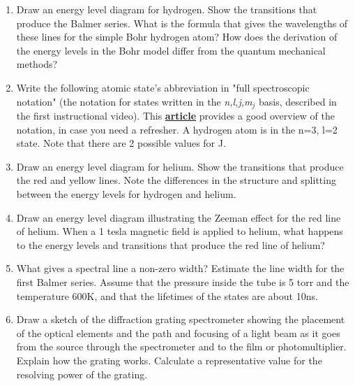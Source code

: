 \documentclass{signatures}
\begin{document}
\maketitle

\names

\prelab

\begin{enumerate}

    \item Draw an energy level diagram for hydrogen. Show the transitions that produce the Balmer series. What is the formula that gives the wavelengths of these lines for the simple Bohr hydrogen atom? How does the derivation of the energy levels in the Bohr model differ from the quantum mechanical methods?
    
    \item Write the following atomic state's abbreviation in "full spectroscopic notation" (the notation for states written in the \emph{n,l,j,m$_j$} basis, described in the first instructional video). This \href{http://www.physics.byu.edu/faculty/bergeson/physics571/notes/L27spectnotation.pdf}{\textbf{article}} provides a good overview of the notation, in case you need a refresher. A hydrogen atom is in the n=3, l=2 state. Note that there are 2 possible values for J. 

    \item Draw an energy level diagram for helium. Show the transitions that produce the red and yellow lines. Note the differences in the structure and splitting between the energy levels for hydrogen and helium.

    \item Draw an energy level diagram illustrating the Zeeman effect for the red line of helium. When a 1 tesla magnetic field is applied to helium, what happens to the energy levels and transitions that produce the red line of helium?

    \item What gives a spectral line a non-zero width? Estimate the line width for the first Balmer series. Assume that the pressure inside the tube is 5 torr and the temperature 600K, and that the lifetimes of the states are about 10ns.

    \item Draw a sketch of the diffraction grating spectrometer showing the placement of the optical elements and the path and focusing of a light beam as it goes from the source through the spectrometer and to the film or photomultiplier. Explain how the grating works. Calculate a representative value for the resolving power of the grating.


\end{enumerate}
\end{document}
